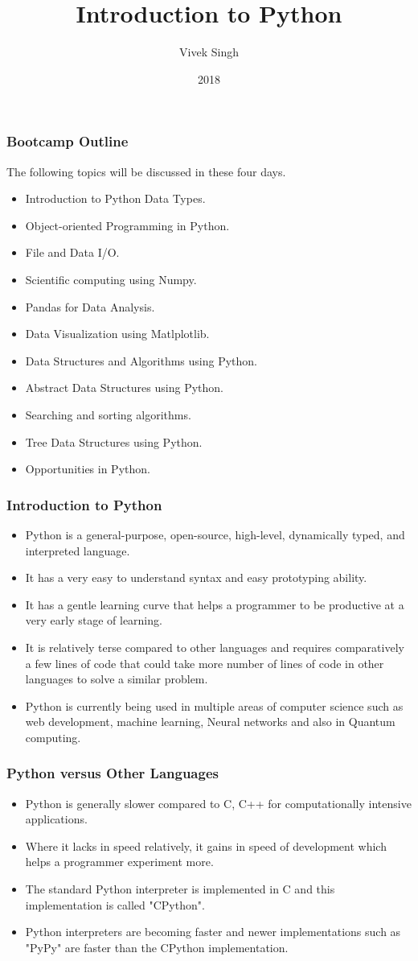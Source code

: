\documentclass{beamer}
\title{Introduction to Python}
\author{Vivek Singh}
\institute{Information Systems Decision Sciences (ISDS)\\
MUMA College of Business\\
University of South Florida \\
Tampa, Florida}
\date{2018}
\begin{document}
 
\frame{\titlepage}

\begin{frame}
\frametitle{Bootcamp Outline}
The following topics will be discussed in these four days.
\begin{itemize}
\item Introduction to Python Data Types.
\item Object-oriented Programming in Python.
\item File and Data I/O.
\item Scientific computing using Numpy. 
\item Pandas for Data Analysis.
\item Data Visualization using Matlplotlib.
\item Data Structures and Algorithms using Python.
\item Abstract Data Structures using Python.
\item Searching and sorting algorithms.
\item Tree Data Structures using Python.
\item Opportunities in Python. 
\end{itemize}
\end{frame}


\begin{frame}
\frametitle{Introduction to Python}
\begin{itemize}
\item Python is a general-purpose, open-source, high-level, dynamically typed, and interpreted language.
\item It has a very easy to understand syntax and easy prototyping ability.
\item It has a gentle learning curve that helps a  programmer to be productive at a very early stage of learning.
\item It is relatively terse compared to other languages and requires comparatively  a few lines of code that could take more number of lines of code in other languages to solve a similar problem.
\item Python is currently being used in multiple areas of computer science such as web development, machine learning, Neural networks and also in Quantum computing.
\end{itemize}
\end{frame}

\begin{frame}
\frametitle{Python versus Other Languages}
\begin{itemize}
\item Python is generally slower compared to C, C++ for computationally intensive applications.
\item Where it lacks in speed relatively, it gains in speed of development which helps a programmer experiment more.
\item The standard Python interpreter is implemented in C and this implementation is called "CPython".
\item Python interpreters are becoming faster and newer implementations such as "PyPy" are faster than the CPython implementation.
\end{itemize}
\end{frame}
\end{document}
